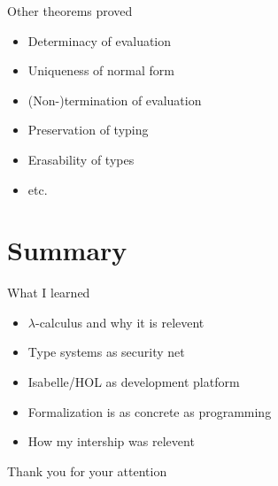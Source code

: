 \documentclass[xcolor=dvipsnames]{beamer}
\begin{document}
\begin{frame}{Other theorems proved}
  \begin{itemize}
    \item Determinacy of evaluation
    \item Uniqueness of normal form
    \item (Non-)termination of evaluation
    \item Preservation of typing
    \item Erasability of types
    \item etc.
  \end{itemize}
\end{frame}

\section*{Summary}

\begin{frame}{What I learned}
  \begin{itemize}
    \item $\lambda$-calculus and why it is relevent
    \item Type systems as security net
    \item Isabelle/HOL as development platform
    \item Formalization is as concrete as programming
    \item How my intership was relevent
  \end{itemize}
\end{frame}

\begin{frame}
  \begin{center}
    Thank you for your attention
  \end{center}
\end{frame}
\end{document}
